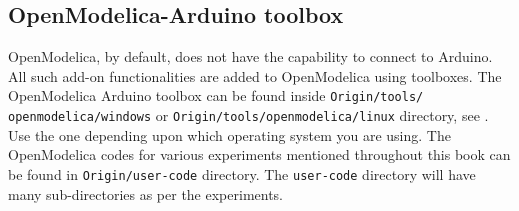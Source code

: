 \subsection{OpenModelica-Arduino toolbox}\label{sec:load-om-toolbox}
OpenModelica, by default, does not have the capability to connect to Arduino. 
All such add-on functionalities are added to OpenModelica using toolboxes.  
The OpenModelica Arduino toolbox can be found inside {\tt Origin/tools/\\openmodelica/windows} or {\tt Origin/tools/openmodelica/linux} directory,
see .  Use the one depending upon
which operating system you are using. The OpenModelica codes for various
experiments mentioned throughout this book can be found in {\tt Origin/user-code} directory. The {\tt user-code} directory will have
many sub-directories as per the experiments. 

